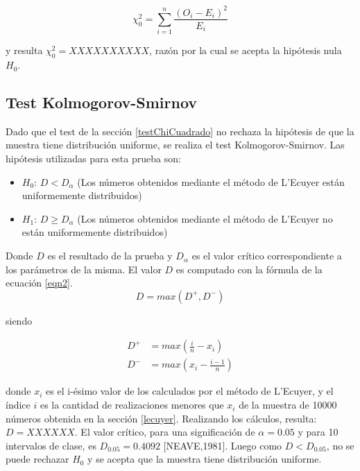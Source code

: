\documentclass{sig-alternate}
\begin{document}
\begin{equation}
\label{eqn1}
 \chi_{0}^{2} = \sum_{i=1}^{n} \frac{(O_i - E_i)^2}{E_i}
\end{equation}

y resulta $\chi_{0}^{2} = XXXXXXXXXX$, raz\'on por la cual se acepta la hip\'otesis nula $H_0$.

\subsection{Test Kolmogorov-Smirnov}
\label{testKolmogorovSmirnov}

Dado que el test de la secci\'on \ref{testChiCuadrado} no rechaza la hip\'otesis de que la muestra tiene distribuci\'on uniforme, se realiza el test Kolmogorov-Smirnov.  Las hip\'otesis utilizadas para esta prueba son:

\begin{itemize}
 \item {$H_{0}$:} $D < D_{\alpha}$ (Los n\'umeros obtenidos mediante el m\'etodo de L'Ecuyer est\'an uniformemente distribuidos)
 \item {$H_{1}$:} $D \ge D_{\alpha}$ (Los n\'umeros obtenidos mediante el m\'etodo de L'Ecuyer no est\'an uniformemente distribuidos)
\end{itemize}

Donde $D$ es el resultado de la prueba y $D_{\alpha}$ es el valor cr\'itico correspondiente a los par\'ametros de la misma.
El valor $D$ es computado con la f\'ormula de la ecuaci\'on \ref{eqn2}.
\begin{equation}
\label{eqn2}
 D = max(D^{+}, D^{-})
\end{equation}

siendo

\begin{align}
 D^{+} &= max(\frac{i}{n}-x_i)\\
 D^{-} &= max(x_i - \frac{i-1}{n})
\end{align}

donde $x_i$ es el i-\'esimo valor de los calculados por el m\'etodo de L'Ecuyer,  y el \'indice $i$ es la cantidad de realizaciones menores que $x_i$ de la muestra de 10000 n\'umeros obtenida en la secci\'on \ref{lecuyer}.
Realizando los c\'alculos, resulta: $D = XXXXXX$.
El valor cr\'itico, para una significaci\'on de $\alpha = 0.05$ y para 10 intervalos de clase, es $D_{0.05} = 0.4092$ [NEAVE,1981]. Luego como $D < D_{0.05}$, no se puede rechazar $H_0$ y se acepta que la muestra tiene distribuci\'on uniforme.
\end{document}
